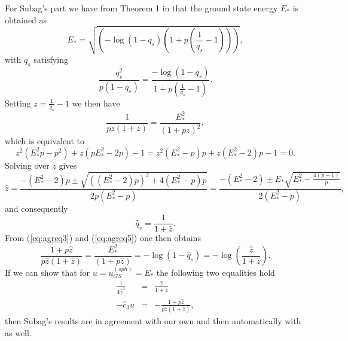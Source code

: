 \documentclass[10pt]{article}
\def\lp{\left (}
\def\rp{\right )}
\begin{document}
For Subag's part we have from Theorem 1 in \cite{Subagtap23b} that the ground state energy $E_*$ is obtained as
\begin{equation}
\label{eq:agreq3}
E_*    = \sqrt{ \lp -\log\lp 1 -q_s  \rp  \lp 1+p\lp\frac{1}{q_s}-1\rp \rp  \rp   },
 \end{equation}
with $q_s$ satisfying
\begin{equation}
\label{eq:agreq4}
 \frac{q_s^2}{p(1-q_s)}  =  \frac{-\log \lp 1 -q_s \rp }{ 1+p\lp\frac{1}{q_s}-1\rp  }.
 \end{equation}
Setting $z=\frac{1}{q_s}-1$ we then have
\begin{equation}
\label{eq:agreq5}
 \frac{1}{pz(1+z)}  =  \frac{E_*^2}{(1+pz)^2},
 \end{equation}
which is equivalent to
\begin{equation}
\label{eq:agreq6}
z^2(E^2_*p-p^2) + z (pE^2_* -2p) -1 =z^2(E^2_*-p)p + z (E^2_* -2)p -1 =0.
 \end{equation}
Solving over $z$ gives
\begin{equation}
\label{eq:agreq7}
\hat{z} = \frac{-(E^2_* -2)p  \pm \sqrt{((E^2_* -2)p )^2 +4 (E^2_*-p)p } }{2p(E^2_*-p)}
= \frac{-(E^2_* -2)  \pm  E_*  \sqrt{E^2_* - \frac{4(p-1)}{p}    }   }{2(E^2_*-p)},
 \end{equation}
 and consequently
\begin{equation}
\label{eq:agreq8}
\hat{q}_s=\frac{1}{1+\hat{z}}.
 \end{equation}
 From (\ref{eq:agreq3})  and (\ref{eq:agreq5}) one then obtains
\begin{equation}
\label{eq:agreq9}
  \frac{1+p\hat{z}}{p\hat{z} (1+\hat{z})} = \frac { E_*^2 } { \lp 1+p\hat{z} \rp } = -\log (1-\hat{q}_s) = -\log \lp  \frac{\hat{z}}{1+\hat{z}} \rp.
 \end{equation}
If we can show that for $u=u_{GS}^{(sph)}=E_*$ the following two equalities hold
\begin{eqnarray}
\label{eq:agreq10}
  \frac{1}{4\hat{\gamma}^2}  & = &  \frac{\hat{z}}{1+\hat{z}} \\
    -\hat{c}_3 u  & =  &  -\frac{1+p\hat{z}}{p\hat{z} (1+\hat{z})} ,\label{eq:agreq10a}
  \end{eqnarray}
then Subag's results are in agreement with our own and then automatically with \cite{DarMc24} as well.


\vspace{.2in}
\end{document}
